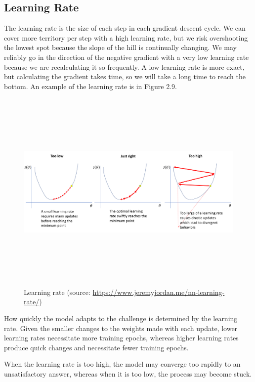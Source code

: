 \subsection{Learning Rate}
\label{subsec:learning_rate}
\hspace{0.5cm}The learning rate is the size of each step in each gradient descent cycle. We can cover more territory per step with a high learning rate, but we risk overshooting the lowest spot because the slope of the hill is continually changing. We may reliably go in the direction of the negative gradient with a very low learning rate because we are recalculating it so frequently. A low learning rate is more exact, but calculating the gradient takes time, so we will take a long time to reach the bottom. An example of the learning rate is in Figure 2.9.
\begin{figure}[!h]
	\centering
	\includegraphics[width=\linewidth, height=10cm,keepaspectratio]{figures/learning rate.png}
   \caption{Learning rate (source: \url{https://www.jeremyjordan.me/nn-learning-rate/})}
\end{figure}

\newpage
How quickly the model adapts to the challenge is determined by the learning rate. Given the smaller changes to the weights made with each update, lower learning rates necessitate more training epochs, whereas higher learning rates produce quick changes and necessitate fewer training epochs.

When the learning rate is too high, the model may converge too rapidly to an unsatisfactory answer, whereas when it is too low, the process may become stuck.

